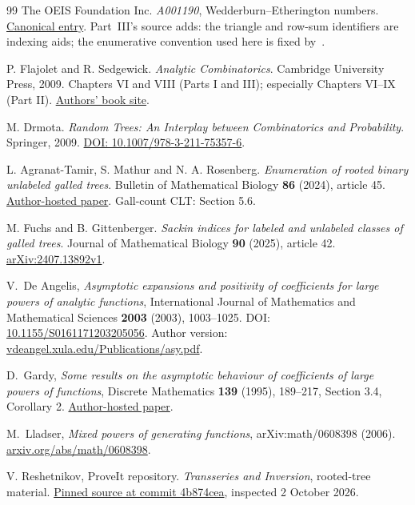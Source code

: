 \documentclass[11pt,letterpaper]{article}
\numberwithin{equation}{section}
\theoremstyle{definition}\newtheorem{definition}[theorem]{Definition}
\theoremstyle{remark}\newtheorem{remark}[theorem]{Remark}
\begin{document}
\begin{thebibliography}{99}
The OEIS Foundation Inc. \emph{A001190}, Wedderburn--Etherington numbers.
\href{https://oeis.org/A001190}{Canonical entry}. Part~III's source adds: the triangle and row-sum identifiers are indexing aids; the enumerative convention used here is fixed by~\cite{comparison}.

P. Flajolet and R. Sedgewick. \emph{Analytic Combinatorics}.
Cambridge University Press, 2009. Chapters VI and VIII (Parts I and III); especially Chapters VI--IX (Part II).
\href{https://ac.cs.princeton.edu/home/}{Authors' book site}.

M. Drmota. \emph{Random Trees: An Interplay between Combinatorics and Probability}.
Springer, 2009. \href{https://doi.org/10.1007/978-3-211-75357-6}{DOI: 10.1007/978-3-211-75357-6}.

L. Agranat-Tamir, S. Mathur and N. A. Rosenberg.
\emph{Enumeration of rooted binary unlabeled galled trees}.
Bulletin of Mathematical Biology \textbf{86} (2024), article 45.
\href{https://web.stanford.edu/group/rosenberglab/papers/AgranatTamirEtAl2024-BMB.pdf}{Author-hosted paper}. Gall-count CLT: Section 5.6.

M. Fuchs and B. Gittenberger.
\emph{Sackin indices for labeled and unlabeled classes of galled trees}.
Journal of Mathematical Biology \textbf{90} (2025), article 42.
\href{https://arxiv.org/html/2407.13892v1}{arXiv:2407.13892v1}.

V.~De Angelis, \emph{Asymptotic expansions and positivity of coefficients for large powers of analytic functions}, International Journal of Mathematics and Mathematical Sciences \textbf{2003} (2003), 1003--1025. DOI: \href{https://doi.org/10.1155/S0161171203205056}{10.1155/S0161171203205056}. Author version: \href{https://vdeangel.xula.edu/Publications/asy.pdf}{vdeangel.xula.edu/Publications/asy.pdf}.

D.~Gardy, \emph{Some results on the asymptotic behaviour of coefficients of large powers of functions}, Discrete Mathematics \textbf{139} (1995), 189--217, Section 3.4, Corollary 2.
\href{https://danielegardy.github.io/SourcesPubli/coeffs_large_powers.pdf}{Author-hosted paper}.

M.~Lladser, \emph{Mixed powers of generating functions}, arXiv:math/0608398 (2006).
\href{https://arxiv.org/abs/math/0608398}{arxiv.org/abs/math/0608398}.

V. Reshetnikov, ProveIt repository.
\emph{Transseries and Inversion}, rooted-tree material.
\href{https://github.com/VladimirReshetnikov/ProveIt/blob/4b874cea0012c51a6841ad9c58f6e20fa57c71da/Analysis/Transseries/docs/series-and-transseries/Transseries_And_Inversion/transseries_and_inversion.tex}{Pinned source at commit 4b874cea}, inspected 2 October 2026.


\end{thebibliography}
\end{document}
